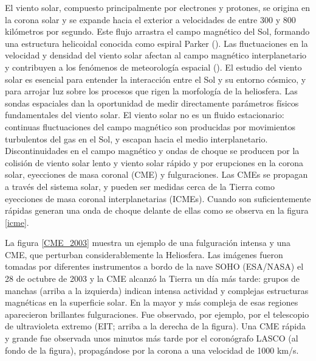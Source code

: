 El viento solar, compuesto principalmente por electrones y protones, se origina en la corona solar y se expande hacia el exterior a velocidades de entre 300 y 800 kilómetros por segundo. Este flujo arrastra el campo magnético del Sol, formando una estructura helicoidal conocida como espiral Parker (\cite{Rozelot_2006}). Las fluctuaciones en la velocidad y densidad del viento solar afectan al campo magnético interplanetario y contribuyen a los fenómenos de meteorología espacial (\cite{Rozelot_2006}). El estudio del viento solar es esencial para entender la interacción entre el Sol y su entorno cósmico, y para arrojar luz sobre los procesos que rigen la morfología de la heliosfera.
Las sondas espaciales dan la oportunidad de medir directamente parámetros físicos fundamentales del viento solar. El viento solar no es un fluido estacionario: continuas fluctuaciones del campo magnético son producidas por movimientos turbulentos del gas en el Sol, y escapan hacia el medio interplanetario. Discontinuidades en el campo magnético y ondas de choque se producen por la colisión de viento solar lento y viento solar rápido y por erupciones en la corona solar, eyecciones de masa coronal (CME) y fulguraciones. Las CMEs se propagan a través del sistema solar, y pueden ser medidas cerca de la Tierra como eyecciones de masa coronal interplanetarias (ICMEs). Cuando son suficientemente rápidas generan una onda de choque delante de ellas como se observa en la figura \ref{icme}.

La figura \ref{CME_2003} muestra un ejemplo de una fulguración intensa y una CME, que perturban considerablemente la Heliosfera. Las imágenes fueron tomadas por diferentes instrumentos a bordo de la nave SOHO (ESA/NASA) el 28 de octubre de 2003  y la CME alcanzó la Tierra un día más tarde: grupos de manchas (arriba a la izquierda) indican intensa actividad y complejas estructuras magnéticas en la superficie solar. En la mayor y más compleja de esas regiones aparecieron brillantes fulguraciones. Fue observado, por ejemplo, por el telescopio de ultravioleta extremo (EIT; arriba a la derecha de la figura). Una CME rápida y grande fue observada unos minutos más tarde por el coronógrafo LASCO (al fondo de la figura), propagándose por la corona a una velocidad de 1000 km/s.

